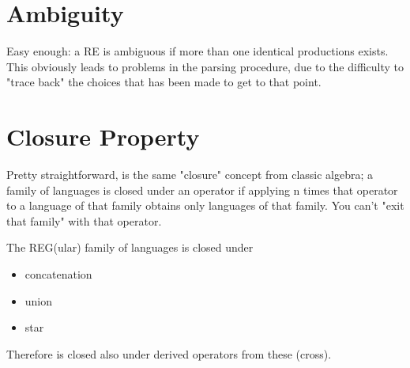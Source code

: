     \section{Ambiguity}
        Easy enough: a RE is ambiguous if more than one identical productions exists. This obviously leads to problems in the parsing procedure, due to the difficulty 
        to "trace back" the choices that has been made to get to that point. 

    \section{Closure Property}
        Pretty straightforward, is the same "closure" concept from classic algebra; a family of languages is closed under an operator if applying n times that 
        operator to a language of that family obtains only languages of that family. You can't "exit that family" with that operator.
        
        The REG(ular) family of languages is closed under
        \begin{itemize}
            \item concatenation
            \item union
            \item star
        \end{itemize}
        Therefore is closed also under derived operators from these (cross).
